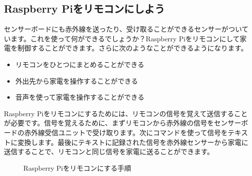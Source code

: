 \subsection{Raspberry Piをリモコンにしよう}

センサーボードにも赤外線を送ったり、受け取ることができるセンサーがついています。これを使って何ができるでしょうか？Raspberry Piをリモコンにして家電を制御することができます。さらに次のようなことができるようになります。

\begin{itemize}
\item リモコンをひとつにまとめることができる
\item 外出先から家電を操作することができる
\item 音声を使って家電を操作することができる
\end{itemize}

Raspberry Piをリモコンにするためには、リモコンの信号を覚えて送信することが必要です。信号を覚えるために、まずリモコンから赤外線の信号をセンサーボードの赤外線受信ユニットで受け取ります。次にコマンドを使って信号をテキストに変換します。最後にテキストに記録された信号を赤外線センサーから家電に送信することで、リモコンと同じ信号を家電に送ることができます。

\begin{figure}[H]
    \centering
 
    \caption{Raspberry Piをリモコンにする手順}
\end{figure}

